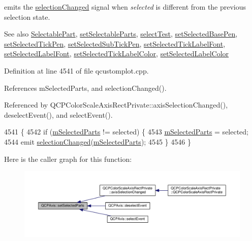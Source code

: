 emits the \hyperlink{class_q_c_p_axis_a62b598abeee7174a05f9d542cc85b1f5}{selection\+Changed} signal when {\itshape selected} is different from the previous selection state.

\begin{DoxySeeAlso}{See also}
\hyperlink{class_q_c_p_axis_abee4c7a54c468b1385dfce2c898b115f}{Selectable\+Part}, \hyperlink{class_q_c_p_axis_a513f9b9e326c505d9bec54880031b085}{set\+Selectable\+Parts}, \hyperlink{class_q_c_p_axis_a2877a6230920c118be65c6113089f467}{select\+Test}, \hyperlink{class_q_c_p_axis_aeb917a909215605b95ef2be843de1ee8}{set\+Selected\+Base\+Pen}, \hyperlink{class_q_c_p_axis_a8360502685eb782edbf04019c9345cdc}{set\+Selected\+Tick\+Pen}, \hyperlink{class_q_c_p_axis_a2a00a7166600155eac26843132eb9576}{set\+Selected\+Sub\+Tick\+Pen}, \hyperlink{class_q_c_p_axis_a845ccb560b7bc5281098a5be494145f6}{set\+Selected\+Tick\+Label\+Font}, \hyperlink{class_q_c_p_axis_a02ec2a75d4d8401eaab834fbc6803d30}{set\+Selected\+Label\+Font}, \hyperlink{class_q_c_p_axis_a9bdbf5e63ab15187f3a1de9440129227}{set\+Selected\+Tick\+Label\+Color}, \hyperlink{class_q_c_p_axis_a5d502dec597c634f491fdd73d151c72d}{set\+Selected\+Label\+Color} 
\end{DoxySeeAlso}


Definition at line 4541 of file qcustomplot.\+cpp.



References m\+Selected\+Parts, and selection\+Changed().



Referenced by Q\+C\+P\+Color\+Scale\+Axis\+Rect\+Private\+::axis\+Selection\+Changed(), deselect\+Event(), and select\+Event().


\begin{DoxyCode}
4541                                                               \{
4542   \textcolor{keywordflow}{if} (\hyperlink{class_q_c_p_axis_a8f1eb0abfe2ae64652aa46b360e841e4}{mSelectedParts} != selected) \{
4543     \hyperlink{class_q_c_p_axis_a8f1eb0abfe2ae64652aa46b360e841e4}{mSelectedParts} = selected;
4544     emit \hyperlink{class_q_c_p_axis_a62b598abeee7174a05f9d542cc85b1f5}{selectionChanged}(\hyperlink{class_q_c_p_axis_a8f1eb0abfe2ae64652aa46b360e841e4}{mSelectedParts});
4545   \}
4546 \}
\end{DoxyCode}


Here is the caller graph for this function\+:\nopagebreak
\begin{figure}[H]
\begin{center}
\leavevmode
\includegraphics[width=350pt]{class_q_c_p_axis_ab9d7a69277dcbed9119b3c1f25ca19c3_icgraph}
\end{center}
\end{figure}


